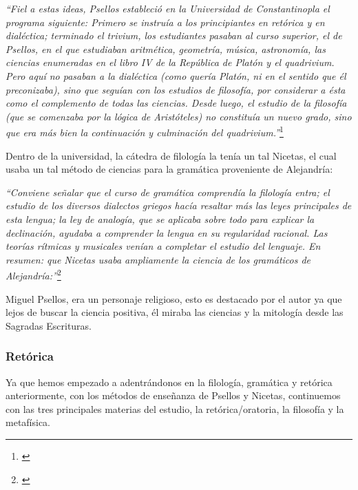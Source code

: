 \textit{“Fiel a estas ideas, Psellos estableció en la Universidad de 
Constantinopla el programa siguiente: Primero se instruía a los 
principiantes en retórica y en dialéctica; terminado el trivium, 
los estudiantes pasaban al curso superior, el de Psellos, en el que 
estudiaban aritmética, geometría, música, astronomía, las ciencias 
enumeradas en el libro IV de la República de Platón y el quadrivium. 
Pero aquí no pasaban a la dialéctica (como quería Platón, ni en el 
sentido que él preconizaba), sino que seguían con los estudios de 
filosofía, por considerar a ésta como el complemento de todas las 
ciencias. Desde luego, el estudio de la filosofía 
(que se comenzaba por la lógica de Aristóteles) no constituía un 
nuevo grado, sino que era más bien la continuación y culminación 
del quadrivium.”}\footnote{\cite[pp.~161--162]{filosofia}}

Dentro de la universidad, la cátedra de filología la tenía un tal 
Nicetas, el cual usaba un tal método de ciencias para la 
gramática proveniente de Alejandría:

\textit{“Conviene señalar que el curso de gramática comprendía la 
filología entra; el estudio de los diversos dialectos griegos 
hacía resaltar más las leyes principales de esta lengua; la 
ley de analogía, que se aplicaba sobre todo para explicar la 
declinación, ayudaba a comprender la lengua en su regularidad 
racional. Las teorías rítmicas y musicales venían a completar el 
estudio del lenguaje. En resumen: que Nicetas usaba ampliamente la 
ciencia de los gramáticos de Alejandría:”}\footnote{\cite[p.~162]{filosofia}}


Miguel Psellos, era un personaje religioso,
esto es destacado por el autor ya que lejos de buscar la ciencia
positiva, él miraba las ciencias y la mitología desde las
Sagradas Escrituras.

\subsubsection{Retórica}
Ya que hemos empezado a adentrándonos en la filología, gramática y 
retórica anteriormente, con los métodos de enseñanza de Psellos y 
Nicetas, continuemos con las tres principales materias del estudio, 
la retórica/oratoria, la filosofía y la metafísica.

